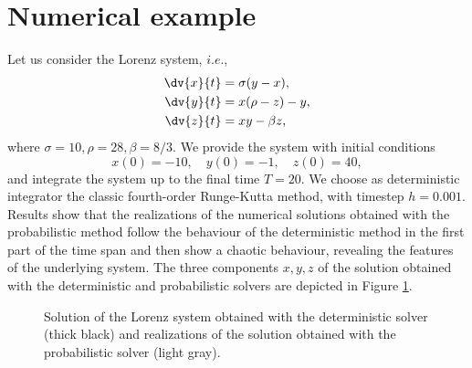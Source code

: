 \section{Numerical example}

Let us consider the Lorenz system, $i.e.$,
\begin{align}
	\dv{x}{t} &= \sigma(y - x), \\
	\dv{y}{t} &= x(\rho - z) - y, \\
	\dv{z}{t} &= xy - \beta z,
\end{align}
where $\sigma = 10, \rho = 28, \beta = 8/3$. We provide the system with initial conditions
\begin{equation}
	x(0) = -10, \quad y(0) = -1, \quad z(0) = 40, 
\end{equation}
and integrate the system up to the final time $T = 20$. We choose as deterministic integrator the classic fourth-order Runge-Kutta method, with timestep $h = 0.001$. Results show that the realizations of the numerical solutions obtained with the probabilistic method follow the behaviour of the deterministic method in the first part of the time span and then show a chaotic behaviour, revealing the features of the underlying system. The three components $x, y, z$ of the solution obtained with the deterministic and probabilistic solvers are depicted in Figure \ref{fig:Lorenz}. 

\begin{figure}[t]
	\centering
	\begin{subfigure}{1\linewidth}
		\resizebox{1.0\linewidth}{!}{}
	\end{subfigure}
	\begin{subfigure}{1\linewidth}
		\resizebox{1.0\linewidth}{!}{}
	\end{subfigure}
	\begin{subfigure}{1\linewidth}
		\resizebox{1.0\linewidth}{!}{}
	\end{subfigure}
	\caption{Solution of the Lorenz system obtained with the deterministic solver (thick black) and realizations of the solution obtained with the probabilistic solver (light gray).}
	\label{fig:Lorenz}
\end{figure}
